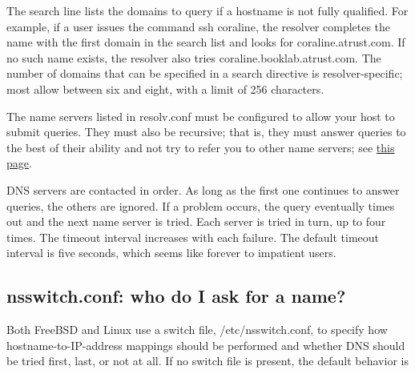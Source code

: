 
The {search} line lists the domains to query if a hostname is not fully
qualified. For example, if a user issues the command {ssh} {coraline},
the resolver completes the name with the first domain in the search list
and looks for coraline.atrust.com. If no such name exists, the resolver
also tries coraline.booklab.atrust.com. The number of domains that can
be specified in a {search} directive is resolver-specific; most allow
between six and eight, with a limit of 256 characters.

The name servers listed in {resolv.conf} must be configured to allow
your host to submit queries. They must also be recursive; that is, they
must answer queries to the best of their ability and not try to refer
you to other name servers; see
\protect\hyperlink{part0024_split_013.htmlux5cux23_idTextAnchor857}{this
page}.

DNS servers are contacted in order. As long as the first one continues
to answer queries, the others are ignored. If a problem occurs, the
query eventually times out and the next name server is tried. Each
server is tried in turn, up to four times. The timeout interval
increases with each failure. The default timeout interval is five
seconds, which seems like forever to impatient users.

\protect\hypertarget{part0024_split_006.html}{}{}

\hypertarget{part0024_split_006.htmlux5cux23_idContainer1069}{}
\hypertarget{part0024_split_006.htmlux5cux23calibre_pb_5}{%
\subsection[: who do I ask for a
name?]{\texorpdfstring{{\protect\hypertarget{part0024_split_006.htmlux5cux23_idTextAnchor848}{}{}nsswitch.conf}:
who do I ask for a
name?}{nsswitch.conf: who do I ask for a name?}}\label{part0024_split_006.htmlux5cux23calibre_pb_5}}

\protect\hypertarget{part0024_split_006.htmlux5cux23_idIndexMarker1981}{}{}Both
FreeBSD and Linux use a switch file,
\protect\hypertarget{part0024_split_006.htmlux5cux23_idIndexMarker1982}{}{}\protect\hypertarget{part0024_split_006.htmlux5cux23_idIndexMarker1983}{}{}{/etc/nsswitch.conf,}
to specify how hostname-to-IP-address mappings should be performed and
whether DNS should be tried first, last, or not at all. If no switch
file is present, the default behavior is


